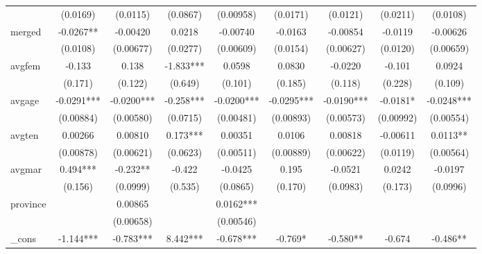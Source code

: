 \begin{table}[htbp]
\begin{tabular}{l*{8}{c}}
            &    (0.0169)   &    (0.0115)   &    (0.0867)   &   (0.00958)   &    (0.0171)   &    (0.0121)   &    (0.0211)   &    (0.0108)   \\
[1em]
merged      &     -0.0267** &    -0.00420   &      0.0218   &    -0.00740   &     -0.0163   &    -0.00854   &     -0.0119   &    -0.00626   \\
            &    (0.0108)   &   (0.00677)   &    (0.0277)   &   (0.00609)   &    (0.0154)   &   (0.00627)   &    (0.0120)   &   (0.00659)   \\
[1em]
avgfem      &      -0.133   &       0.138   &      -1.833***&      0.0598   &      0.0830   &     -0.0220   &      -0.101   &      0.0924   \\
            &     (0.171)   &     (0.122)   &     (0.649)   &     (0.101)   &     (0.185)   &     (0.118)   &     (0.228)   &     (0.109)   \\
[1em]
avgage      &     -0.0291***&     -0.0200***&      -0.258***&     -0.0200***&     -0.0295***&     -0.0190***&     -0.0181*  &     -0.0248***\\
            &   (0.00884)   &   (0.00580)   &    (0.0715)   &   (0.00481)   &   (0.00893)   &   (0.00573)   &   (0.00992)   &   (0.00554)   \\
[1em]
avgten      &     0.00266   &     0.00810   &       0.173***&     0.00351   &      0.0106   &     0.00818   &    -0.00611   &      0.0113** \\
            &   (0.00878)   &   (0.00621)   &    (0.0623)   &   (0.00511)   &   (0.00889)   &   (0.00622)   &    (0.0119)   &   (0.00564)   \\
[1em]
avgmar      &       0.494***&      -0.232** &      -0.422   &     -0.0425   &       0.195   &     -0.0521   &      0.0242   &     -0.0197   \\
            &     (0.156)   &    (0.0999)   &     (0.535)   &    (0.0865)   &     (0.170)   &    (0.0983)   &     (0.173)   &    (0.0996)   \\
[1em]
province    &               &     0.00865   &               &      0.0162***&               &               &               &               \\
            &               &   (0.00658)   &               &   (0.00546)   &               &               &               &               \\
[1em]
\_cons      &      -1.144***&      -0.783***&       8.442***&      -0.678***&      -0.769*  &      -0.580** &      -0.674   &      -0.486** \\

\end{tabular}
\end{table}
